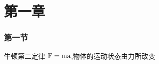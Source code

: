 
\section{第一章}

\begin{frame}
\frametitle{第一节}
	\begin{theorem}{牛顿第二定律}
		$\rm{F} = \rm{m} \rm{a}$,物体的运动状态由力所改变
	\end{theorem}
\end{frame}